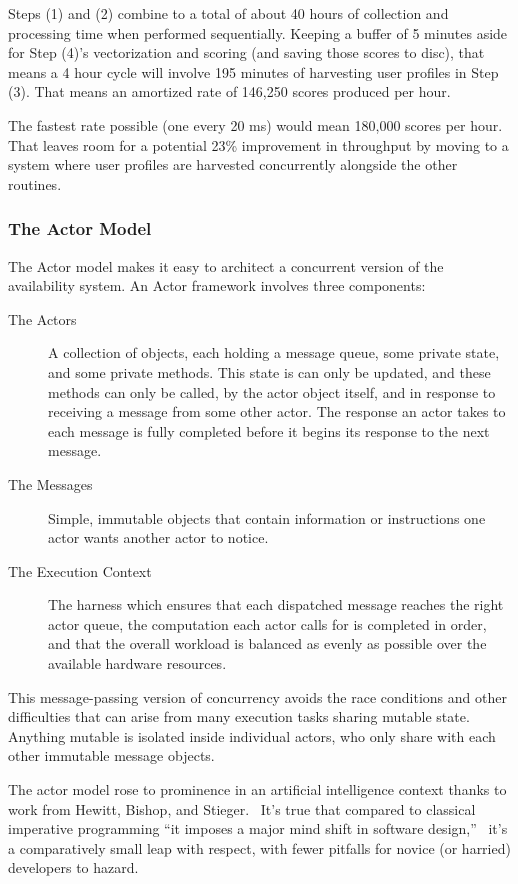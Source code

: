 \documentclass{article}
\begin{document}
 Steps (1) and (2) combine to a total of about 40 hours of collection and
processing time when performed sequentially. Keeping a buffer of 5 minutes aside
for Step (4)'s vectorization and scoring (and saving those scores to disc), that
means a 4 hour cycle will involve 195 minutes of harvesting user profiles in
Step (3). That means an amortized rate of 146,250 scores produced per hour. 

The fastest rate possible (one every 20 ms) would mean 180,000 scores per
hour. That leaves room for a potential 23\% improvement in throughput
by moving to a system where user profiles are harvested concurrently
alongside the other routines.

\subsubsection{The Actor Model}

The Actor model makes it easy to architect a concurrent version of the
availability system. An Actor framework involves three components:

\begin{description}
\item[The Actors] A collection of objects, each holding a message queue, some 
private state, and some private methods. This state is can only be updated, and
these methods can only be called, by the actor object itself, and in response to 
receiving a message from some other actor. The response an actor takes to each
message is fully completed before it begins its response to the next message.
\item[The Messages] Simple, immutable objects that contain information or 
instructions one actor wants another actor to notice. 
\item[The Execution Context] The harness which ensures that each dispatched 
message reaches the right actor queue, the computation each actor calls for is
completed in order, and that the overall workload is balanced as evenly as possible
over the available hardware resources.
\end{description}

This message-passing version of concurrency avoids the race conditions and
other difficulties that can arise from many execution tasks sharing mutable state.
Anything mutable is isolated inside individual actors, who only share with each
other immutable message objects.

The actor model rose to prominence in an artificial intelligence context thanks to
work from Hewitt, Bishop, and Stieger.~\cite{hewitt1973ijcai} It's true that compared
to classical imperative programming ``it imposes a major mind shift in software
design,''~\cite{korland2011thesis} it's a comparatively small leap with respect, with
fewer pitfalls for novice (or harried) developers to hazard.
\end{document}
